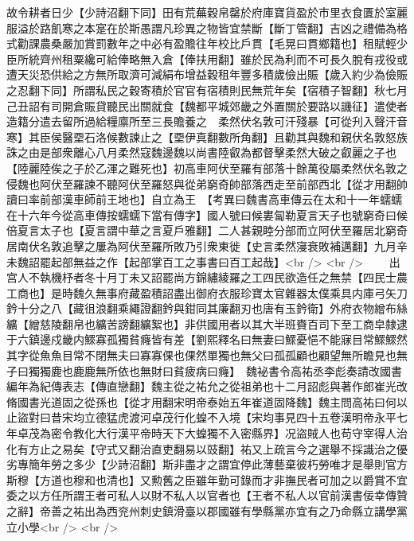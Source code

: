 故令耕者日少【少詩沼翻下同】田有荒蕪穀帛罄於府庫寶貨盈於市里衣食匱於室麗服溢於路飢寒之本寔在於斯愚謂凡珍異之物皆宜禁斷【斷丁管翻】吉凶之禮備為格式勸課農桑嚴加賞罰數年之中必有盈贍往年校比戶貫【毛晃曰貫鄉籍也】租賦輕少臣所統齊州租粟纔可給俸略無入倉【俸扶用翻】雖於民為利而不可長久脫有戎役或遭天災恐供給之方無所取濟可減絹布增益穀租年豐多積歲儉出賑【歲入約少為儉賑之忍翻下同】所謂私民之穀寄積於官官有宿積則民無荒年矣【宿積子智翻】秋七月己丑詔有司開倉賑貸聽民出關就食【魏都平城郊畿之外置關於要路以譏征】遣使者造籍分遣去留所過給糧廪所至三長贍養之　柔然伏名敦可汗殘暴【可從刋入聲汗音寒】其臣侯醫垔石洛候數諫止之【垔伊真翻數所角翻】且勸其與魏和親伏名敦怒族誅之由是部衆離心八月柔然寇魏邊魏以尚書陸叡為都督擊柔然大破之叡麗之子也【陸麗陸俟之子於乙渾之難死也】初高車阿伏至羅有部落十餘萬役屬柔然伏名敦之侵魏也阿伏至羅諫不聽阿伏至羅怒與從弟窮奇帥部落西走至前部西北【從才用翻帥讀曰率前部漢車師前王地也】自立為王　【考異曰魏書高車傳云在太和十一年蠕蠕在十六年今從高車傳按蠕蠕下當有傳字】國人號曰候婁匐勒夏言天子也號窮奇曰候倍夏言太子也【夏言謂中華之言夏戶雅翻】二人甚親睦分部而立阿伏至羅居北窮奇居南伏名敦追擊之屢為阿伏至羅所敗乃引衆東徙【史言柔然寖衰敗補邁翻】九月辛未魏詔罷起部無益之作【起部掌百工之事書曰百工起哉】<br />
<br />
　　出宫人不執機杼者冬十月丁未又詔罷尚方錦繡綾羅之工四民欲造任之無禁【四民士農工商也】是時魏久無事府藏盈積詔盡出御府衣服珍寶太官雜器太僕乘具内庫弓矢刀鈐十分之八【藏徂浪翻乘繩證翻鈐與鉗同其廉翻刃也唐有玉鈐衛】外府衣物繒布絲纊【繒慈陵翻帛也纊苦謗翻纊絮也】非供國用者以其大半班賚百司下至工商皁隸逮于六鎮邊戍畿内鰥寡孤獨貧癃皆有差【劉熙釋名曰無妻曰鰥憂悒不能寐目常鰥鰥然其字從魚魚目常不閉無夫曰寡寡倮也倮然單獨也無父曰孤孤顧也顧望無所瞻見也無子曰獨獨鹿也鹿鹿無所依也無財曰貧疲病曰癃】　魏袐書令高祐丞李彪奏請改國書編年為紀傳表志【傳直戀翻】魏主從之祐允之從祖弟也十二月詔彪與著作郎崔光改脩國書光道固之從孫也【從才用翻宋明帝泰始五年崔道固降魏】魏主問高祐曰何以止盜對曰昔宋均立德猛虎渡河卓茂行化蝗不入境【宋均事見四十五卷漢明帝永平七年卓茂為密令教化大行漢平帝時天下大蝗獨不入密縣界】况盜賊人也苟守宰得人治化有方止之易矣【守式又翻治直吏翻易以豉翻】祐又上疏言今之選舉不採識治之優劣專簡年勞之多少【少詩沼翻】斯非盡才之謂宜停此薄藝棄彼朽勞唯才是舉則官方斯穆【方道也穆和也清也】又勲舊之臣雖年勤可錄而才非撫民者可加之以爵賞不宜委之以方任所謂王者可私人以財不私人以官者也【王者不私人以官前漢書佞幸傳贊之辭】帝善之祐出為西兖州刺史鎮滑臺以郡國雖有學縣黨亦宜有之乃命縣立講學黨立小學<br />
<br />
